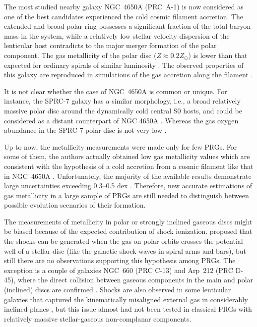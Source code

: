 \documentclass[useAMS,usenatbib]{mnras}
\begin{document}
The most studied nearby galaxy NGC~4650A \hbox{(PRC A-1)} is now considered as one of the best  candidates experienced the cold cosmic filament accretion. The extended and broad polar ring  \citep[or `a polar disc' according to][]{Iodice2006} possesses a significant fraction of the total baryon mass in the system, while a relatively low stellar velocity dispersion of the lenticular host contradicts to the major merger formation  of the polar component. The gas metallicity of the  polar disc ($Z\approx0.2Z_\odot$)  is lower than that expected for ordinary spirals of similar luminosity \citep{Spavone2010,Iodice2015}. The observed properties of this galaxy are reproduced in  simulations of the gas accretion along the filament \citep{Maccio2006,Brook2008,Snaith2012}. 

It is not clear whether the case of NGC~4650A is common or unique. For instance, the SPRC-7 galaxy has a  similar morphology, i.e., a broad relatively massive polar disc around the dynamically cold central S0 hosts, and  could be considered as a distant  counterpart of NGC 4650A \citep{Brosch2010,Khoperskov2014}. Whereas the gas oxygen abundance in the SPRC-7 polar disc is not very low \citep{Brosch2010}.   


Up to now, the metallicity measurements were made only for few PRGs. For some of them, the authors actually obtained low gas metallicity values which are consistent with the hypothesis of a cold accretion from a cosmic filament like that in NGC~4650A \citep*[see, e.g.,][and references therein]{Spavone2015}. Unfortunately, the majority of  the available results demonstrate large uncertainties exceeding 0.3--0.5 dex \citep[see Fig.~9 in][]{Spavone2015}.
Therefore, new accurate estimations of gas metallicity in a large sample of PRGs are still needed to distinguish  between possible evolution scenarios of their formation.

The measurements of metallicity in polar or  strongly inclined gaseous discs might be biased because of the expected contribution of shock ionization. \citet{Wakamatsu1993} proposed that the shocks can be generated when the gas on polar orbits crosses the potential well of a stellar disc (like the galactic shock waves in spiral arms and bars), but  still there are no observations  supporting this hypothesis among  PRGs. The  exception is  a couple of galaxies NGC~660 (PRC C-13) and Arp~212 (PRC D-45), where the direct collision between gaseous components in the main and polar (inclined) discs are confirmed \citep{Moiseev2014late}. Shocks are also observed in some lenticular  galaxies that captured the kinematically misaligned external  gas  in considerably inclined planes \citep{Silchenko2009, Katkov2011, Katkov2014}, but this issue almost had not been tested in classical PRGs with relatively massive stellar-gaseous non-complanar components. 
\end{document}
